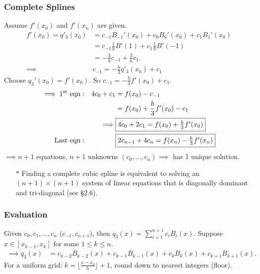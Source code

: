 \documentclass[]{article}
\begin{document}
\subsubsection*{Complete Splines}

Assume $f'(x_0)$ and $f'(x_n)$ are given.
\begin{align*}
	f'(x_0) = q'_3(x_0) &= c_{-1} B_{-1}'(x_0) + c_0 B_0'(x_0) + c_1 B_1'(x_0) \\
			  &= c_{-1} \frac1h B'(1) + c_1 \frac1h B'(-1) \\
			  &= -\frac3h c_{-1} + \frac3h c_1. \\
	\implies & c_{-1} = -\frac h3 q'_3(x_0) + c_1
\end{align*}
Choose $q_3'(x_0) = f'(x_0)$.
So \ul{$c_{-1} = -\frac h3 f'(x_0) + c_1$}.
\begin{align*}
	\implies 1^\text{st} \text{ eqn} &: & 4c_0 + c_1 &= f(x_0) - c_{-1} \\
									 &  & &= f(x_0) + \frac h3 f'(x_0) - c_1 \\
									 & & \implies & \fbox{$4c_0 + 2c_1 = f(x_0) + \frac h3 f'(x_0)$} \\
	\text{Last eqn} &: & & \fbox{$ 2c_{n-1} + 4c_n = f(x_n) - \frac h3 f'(x_n)$}
\end{align*}
$\implies n+1$ equations, $n+1$ unknowns $(c_0,\dots,c_n) \implies $ has 1 unique solution.
\begin{enumerate}
	\item[$*$] Finding a complete cubic spline is equivalent to solving an $(n+1)\times(n+1)$ system of linear equations that is diagonally dominant and tri-diagonal (see \S2.6).
\end{enumerate}

\subsubsection*{Evaluation}

Given $c_0,c_1,\dots,c_n$ ($c_{-1},c_{n+1}$), then $q_3(x) = \sum_{i=1}^{n+1} c_i B_i(x)$.
Suppose $x\in[x_{k-1},x_k]$ for some $1\leq k\leq n$.
\begin{align*}
	\implies q_3(x) &= c_{k-2} B_{k-2}(x) + c_{k-1} B_{k-1}(x) + c_kB_k(x) + c_{k+1}B_{k+1}(x).
\end{align*}
For a uniform grid: $k = \lfloor \frac{x-x_0}h \rfloor +1$, round down to nearest integers (floor).
\end{document}
